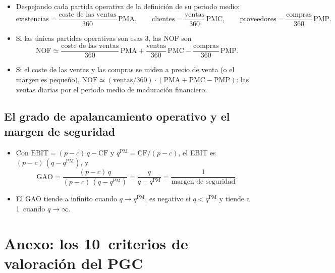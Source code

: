 \documentclass[11pt]{article}
\begin{document}
\begin{itemize}
\item Despejando cada partida operativa de la definición de su periodo medio:
  \[
  \text{existencias}=\frac{\text{coste de las ventas}}{360}\,\mathrm{PMA},\qquad \text{clientes}=\frac{\text{ventas}}{360}\,\mathrm{PMC},\qquad \text{proveedores}=\frac{\text{compras}}{360}\,\mathrm{PMP}.
  \]
\item Si las únicas partidas operativas son esas 3, las NOF son
  \[
  \mathrm{NOF}\simeq\frac{\text{coste de las ventas}}{360}\,\mathrm{PMA}+\frac{\text{ventas}}{360}\,\mathrm{PMC}-\frac{\text{compras}}{360}\,\mathrm{PMP}.
  \]
\item Si el coste de las ventas y las compras se miden a precio de venta (o el margen es pequeño), $\mathrm{NOF}\simeq(\text{ventas}/360)\cdot(\mathrm{PMA}+\mathrm{PMC}-\mathrm{PMP})$: las ventas diarias por el periodo medio de maduración financiero. \findemo
\end{itemize}

\subsection{El grado de apalancamiento operativo y el margen de seguridad}\label{anexo:gao}

\begin{itemize}
\item Con $\mathrm{EBIT}=(p-c)\,q-\mathrm{CF}$ y $q^{\mathrm{PM}}=\mathrm{CF}/(p-c)$, el EBIT es $(p-c)\,(q-q^{\mathrm{PM}})$, y
  \[
  \mathrm{GAO}=\frac{(p-c)\,q}{(p-c)\,(q-q^{\mathrm{PM}})}=\frac{q}{q-q^{\mathrm{PM}}}=\frac{1}{\text{margen de seguridad}}.
  \]
\item El GAO tiende a infinito cuando $q\to q^{\mathrm{PM}}$, es negativo si $q<q^{\mathrm{PM}}$ y tiende a 1~cuando $q\to\infty$. \findemo
\end{itemize}

\section{Anexo: los 10~criterios de valoración del PGC}\label{anexo:valoracion}
\end{document}
